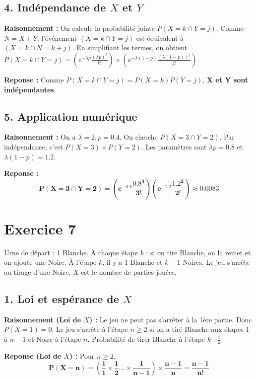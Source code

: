 \documentclass[11pt,a4paper]{article}
\begin{document}
\subsection*{4. Indépendance de $X$ et $Y$}

\textbf{Raisonnement :} On calcule la probabilité jointe $P(X=k \cap Y=j)$. Comme $N = X + Y$, l'événement $(X=k \cap Y=j)$ est équivalent à $(X=k \cap N=k+j)$.
En simplifiant les termes, on obtient $P(X=k \cap Y=j) = \left(e^{-\lambda p}\frac{(\lambda p)^k}{k!}\right) \times \left(e^{-\lambda(1-p)}\frac{(\lambda(1-p))^j}{j!}\right)$.

\textbf{Reponse :} Comme $P(X=k \cap Y=j) = P(X=k)P(Y=j)$, \textbf{X et Y sont indépendantes}.

\subsection*{5. Application numérique}

\textbf{Raisonnement :} On a $\lambda=2, p=0.4$. On cherche $P(X=3 \cap Y=2)$. Par indépendance, c'est $P(X=3) \times P(Y=2)$. Les paramètres sont $\lambda p = 0.8$ et $\lambda(1-p) = 1.2$.

\textbf{Reponse :} 
$$
\mathbf{P(X=3 \cap Y=2) = \left(e^{-0.8}\frac{0.8^3}{3!}\right) \left(e^{-1.2}\frac{1.2^2}{2!}\right) \approx 0.0083}
$$

\hrulefill

\section*{Exercice 7}

Urne de départ : 1 Blanche. À chaque étape $k$ : si on tire Blanche, on la remet et on ajoute une Noire. À l'étape $k$, il y a 1 Blanche et $k-1$ Noires. Le jeu s'arrête au tirage d'une Noire. $X$ est le nombre de parties jouées.

\subsection*{1. Loi et espérance de $X$}

\textbf{Raisonnement (Loi de $X$) :} Le jeu ne peut pas s'arrêter à la 1ère partie. Donc $P(X=1) = 0$.
Le jeu s'arrête à l'étape $n \ge 2$ si on a tiré Blanche aux étapes 1 à $n-1$ et Noire à l'étape $n$. Probabilité de tirer Blanche à l'étape $k$ : $\frac{1}{k}$.

\textbf{Reponse (Loi de $X$) :} Pour $n \ge 2$,
$$
\mathbf{P(X=n) = \left(\frac{1}{1} \times \frac{1}{2} \dots \times \frac{1}{n-1}\right) \times \frac{n-1}{n} = \frac{n-1}{n!}}
$$
\end{document}
